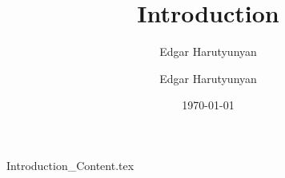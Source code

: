 \documentclass[aspectratio=\BeamerAspectRatio]{beamer}
\title[Introduction]{Introduction}
\subtitle[]{Edgar Harutyunyan}
\author{Edgar Harutyunyan}
\institute
{Molecular Nanophotonics Group\\
Peter Debye Institute for Soft Matter Physics\\
Universit\"at Leipzig}
\date{\today}
\begin{document}
\maketitlepage

{Introduction_Content.tex}

\end{document}
